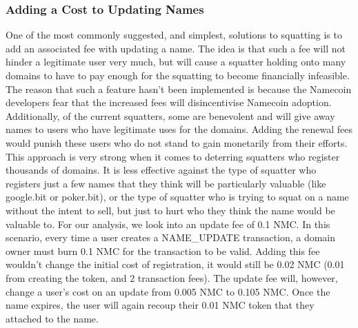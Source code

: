 \subsubsection{Adding a Cost to Updating Names}
    One of the most commonly suggested, and simplest, solutions to squatting is to add an associated fee with updating a name. The idea is that such a fee will not hinder a legitimate user very much, but will cause a squatter holding onto many domains to have to pay enough for the squatting to become financially infeasible. The reason that such a feature hasn't been implemented is because the Namecoin developers fear that the increased fees will disincentivise Namecoin adoption. Additionally, of the current squatters, some are benevolent and will give away names to users who have legitimate uses for the domains. Adding the renewal fees would punish these users who do not stand to gain monetarily from their efforts. This approach is very strong when it comes to deterring squatters who register thousands of domains. It is less effective against the type of squatter who registers just a few names that they think will be particularly valuable (like google.bit or poker.bit), or the type of squatter who is trying to squat on a name without the intent to sell, but just to hurt who they think the name would be valuable to.
For our analysis, we look into an update fee of 0.1 NMC. In this scenario, every time a user creates a NAME\_UPDATE transaction, a domain owner must burn 0.1 NMC for the transaction to be valid. Adding this fee wouldn't change the initial cost of registration, it would still be 0.02 NMC (0.01 from creating the token, and 2 transaction fees). The update fee will, however, change a user's cost on an update from 0.005 NMC to 0.105 NMC. Once the name expires, the user will again recoup their 0.01 NMC token that they attached to the name. 

